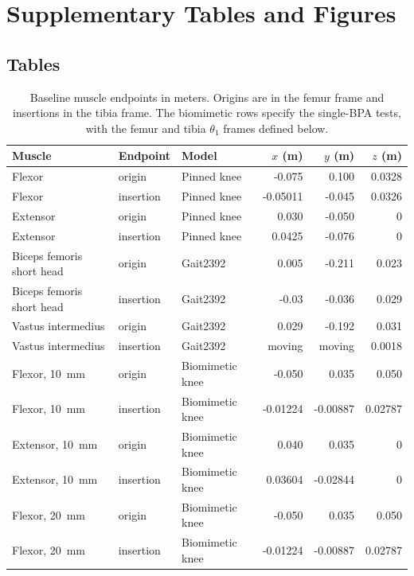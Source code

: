 \documentclass[utf8]{frontiers_suppmat} %
\begin{document}
\raggedbottom
\onecolumn
{}
\title[Supplementary Material]{{}}
\maketitle

\section{Supplementary Tables and Figures}

\subsection{Tables}


\begin{table}[htbp]
\caption{Baseline muscle endpoints in meters. Origins are in the femur frame and insertions in the tibia frame. The biomimetic rows specify the single-BPA tests, with the femur and tibia $\theta_1$ frames defined below.}
\label{table:muscle_attachment}
\centering
\small
\begin{tabular}{@{}lllrrr@{}} 
\toprule
\textbf{Muscle} & \textbf{Endpoint} & \textbf{Model} & \textbf{$x$ (m)} & \textbf{$y$ (m)} & \textbf{$z$ (m)} \\
\midrule
 Flexor & origin & Pinned knee & -0.075 & 0.100 & 0.0328 \\
 Flexor & insertion & Pinned knee & -0.05011 & -0.045 & 0.0326 \\
 Extensor & origin & Pinned knee & 0.030 & -0.050 & 0 \\
 Extensor & insertion & Pinned knee & 0.0425 & -0.076 & 0 \\  
 Biceps femoris short head & origin & Gait2392 & 0.005 & -0.211 & 0.023 \\
 Biceps femoris short head & insertion & Gait2392 & -0.03 & -0.036 & 0.029 \\
 Vastus intermedius & origin & Gait2392 & 0.029 & -0.192 & 0.031 \\
 Vastus intermedius & insertion & Gait2392 & moving & moving & 0.0018 \\  
 Flexor, \qty{10}{\milli\metre} & origin & Biomimetic knee & -0.050 & 0.035 & 0.050 \\
 Flexor, \qty{10}{\milli\metre} & insertion & Biomimetic knee  & -0.01224 & -0.00887 & 0.02787 \\
 Extensor, \qty{10}{\milli\metre} & origin & Biomimetic knee  & 0.040 & 0.035 & 0 \\
 Extensor, \qty{10}{\milli\metre} & insertion & Biomimetic knee  & 0.03604 & -0.02844 & 0 \\
 Flexor, \qty{20}{\milli\metre} & origin & Biomimetic knee  & -0.050 & 0.035 & 0.050  \\
 Flexor, \qty{20}{\milli\metre} & insertion & Biomimetic knee  & -0.01224 & -0.00887 & 0.02787 \\
\bottomrule
\end{tabular}
\end{table}
\end{document}
